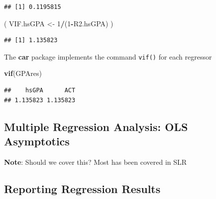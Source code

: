 \documentclass[]{book}
\newenvironment{Shaded}{\begin{snugshade}}{\end{snugshade}}
\newcommand{\DecValTok}[1]{\textcolor[rgb]{0.00,0.00,0.81}{#1}}
\newcommand{\KeywordTok}[1]{\textcolor[rgb]{0.13,0.29,0.53}{\textbf{#1}}}
\newcommand{\NormalTok}[1]{#1}
\newcommand{\OperatorTok}[1]{\textcolor[rgb]{0.81,0.36,0.00}{\textbf{#1}}}
\newcommand{\StringTok}[1]{\textcolor[rgb]{0.31,0.60,0.02}{#1}}
\begin{document}
\begin{verbatim}
## [1] 0.1195815
\end{verbatim}

\begin{Shaded}
\begin{Highlighting}[]
\NormalTok{( VIF.hsGPA <-}\StringTok{ }\DecValTok{1}\OperatorTok{/}\NormalTok{(}\DecValTok{1}\OperatorTok{-}\NormalTok{R2.hsGPA) )}
\end{Highlighting}
\end{Shaded}

\begin{verbatim}
## [1] 1.135823
\end{verbatim}

The \textbf{car} package implements the command \texttt{vif()} for each
regressor

\begin{Shaded}
\begin{Highlighting}[]
\KeywordTok{vif}\NormalTok{(GPAres)}
\end{Highlighting}
\end{Shaded}

\begin{verbatim}
##    hsGPA      ACT 
## 1.135823 1.135823
\end{verbatim}

\hypertarget{multiple-regression-analysis-ols-asymptotics}{%
\subsection{Multiple Regression Analysis: OLS
Asymptotics}\label{multiple-regression-analysis-ols-asymptotics}}

\textbf{Note}: Should we cover this? Most has been covered in SLR

\hypertarget{reporting-regression-results}{%
\subsection{Reporting Regression
Results}\label{reporting-regression-results}}
\end{document}
